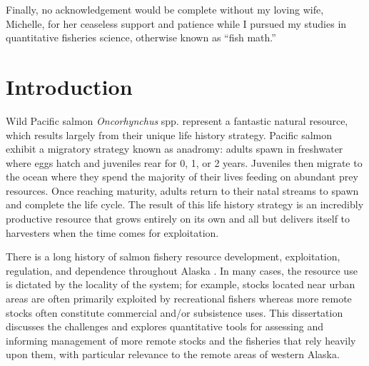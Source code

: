\documentclass[12pt,]{book}
\theoremstyle{definition}
\theoremstyle{definition}
\theoremstyle{definition}
\theoremstyle{remark}
\begin{document}
\begin{romanpages}
\begin{acknowledgments}
Finally, no acknowledgement would be complete without my loving wife, Michelle, for her ceaseless support and patience while I pursued my studies in quantitative fisheries science, otherwise known as ``fish math.''
\end{acknowledgments}

\newpage

\begin{singlespace}
	\tableofcontents
	\clearpage
	\listoffigures
	\clearpage
	\listoftables
\end{singlespace}

\end{romanpages}        %

\normalem       %

\setlength{\parskip}{0pt plus 0pt minus 0pt}

\doublespacing

\chapter{Introduction}\label{ch1}

\noindent
Wild Pacific salmon \emph{Oncorhynchus} spp. represent a fantastic
natural resource, which results largely from their unique life history
strategy. Pacific salmon exhibit a migratory strategy known as anadromy:
adults spawn in freshwater where eggs hatch and juveniles rear for 0, 1,
or 2 years. Juveniles then migrate to the ocean where they spend the
majority of their lives feeding on abundant prey resources. Once
reaching maturity, adults return to their natal streams to spawn and
complete the life cycle. The result of this life history strategy is an
incredibly productive resource that grows entirely on its own and all
but delivers itself to harvesters when the time comes for exploitation.

There is a long history of salmon fishery resource development,
exploitation, regulation, and dependence throughout Alaska
\citep{cooley-1963}. In many cases, the resource use is dictated by the
locality of the system; for example, stocks located near urban areas are
often primarily exploited by recreational fishers whereas more remote
stocks often constitute commercial and/or subsistence uses. This
dissertation discusses the challenges and explores quantitative tools
for assessing and informing management of more remote stocks and the
fisheries that rely heavily upon them, with particular relevance to the
remote areas of western Alaska.
\end{document}
